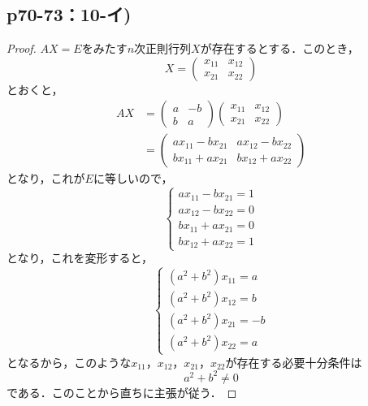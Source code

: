 \documentclass[uplatex,dvipdfmx,a4paper,10pt,fleqn]{jsarticle}
\begin{document}
\newpage 


\subsection*{p70-73：10-イ)}

\begin{tleftbar}
    \begin{proof}
    $AX=E$をみたす$n$次正則行列$X$が存在するとする．このとき，
    \[
        X = \begin{pmatrix} x_{11} & x_{12} \\ x_{21} & x_{22} \end{pmatrix}
    \]
    とおくと，
    \begin{align*}
        AX & = \begin{pmatrix} a & -b \\ b & a \end{pmatrix} \begin{pmatrix} x_{11} & x_{12} \\ x_{21} & x_{22} \end{pmatrix} \\
        & = \begin{pmatrix} ax_{11}-bx_{21} & ax_{12}-bx_{22} \\ bx_{11}+ax_{21} & bx_{12}+ax_{22} \end{pmatrix}
    \end{align*} 
    となり，これが$E$に等しいので，
    \[
        \begin{cases} 
            ax_{11}-bx_{21} =1 \\
            ax_{12}-bx_{22} =0 \\
            bx_{11}+ax_{21} =0 \\
            bx_{12}+ax_{22} =1
        \end{cases}
    \]
    となり，これを変形すると，
    \[
        \begin{cases} 
            (a^2+b^2) x_{11} = a \\
            (a^2+b^2) x_{12} = b \\
            (a^2+b^2) x_{21}=-b \\
            (a^2+b^2) x_{22} = a
        \end{cases}
    \]
    となるから，このような$x_{11}$，$x_{12}$，$x_{21}$，$x_{22}$が存在する必要十分条件は
    \[
    a^2 + b^2 \ne 0
    \]
    である．このことから直ちに主張が従う．
    \end{proof}
\end{tleftbar}
\end{document}
